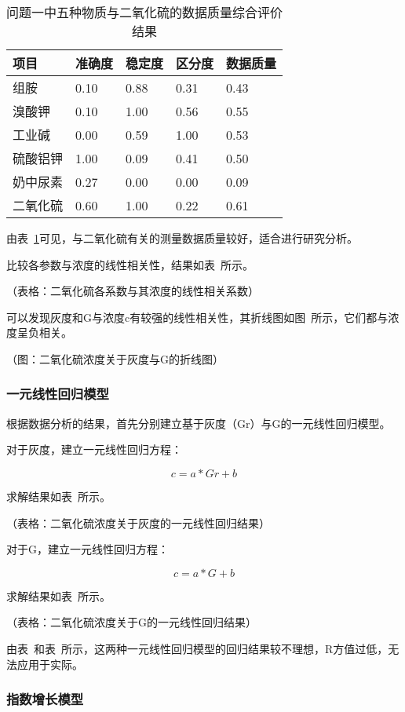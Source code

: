 \begin{table}[]
    \centering
    \caption{问题一中五种物质与二氧化硫的数据质量综合评价结果}
    \label{SO2_Judge}
    \begin{tabular}{@{}lllll@{}}
    \toprule
    项目   & 准确度  & 稳定度  & 区分度  & 数据质量 \\ \midrule
    组胺   & 0.10 & 0.88 & 0.31 & 0.43 \\
    溴酸钾  & 0.10 & 1.00 & 0.56 & 0.55 \\
    工业碱  & 0.00 & 0.59 & 1.00 & 0.53 \\
    硫酸铝钾 & 1.00 & 0.09 & 0.41 & 0.50 \\
    奶中尿素 & 0.27 & 0.00 & 0.00 & 0.09 \\
    二氧化硫 & 0.60 & 1.00 & 0.22 & 0.61 \\ \bottomrule
    \end{tabular}
    \end{table}

由表~\ref{SO2_Judge}可见，与二氧化硫有关的测量数据质量较好，适合进行研究分析。

比较各参数与浓度的线性相关性，结果如表~所示。

（表格：二氧化硫各系数与其浓度的线性相关系数）

可以发现灰度和G与浓度c有较强的线性相关性，其折线图如图~所示，它们都与浓度呈负相关。

（图：二氧化硫浓度关于灰度与G的折线图）

\subsubsection{一元线性回归模型}

根据数据分析的结果，首先分别建立基于灰度（Gr）与G的一元线性回归模型。

对于灰度，建立一元线性回归方程：

$$c=a*Gr+b$$

求解结果如表~所示。

（表格：二氧化硫浓度关于灰度的一元线性回归结果）

对于G，建立一元线性回归方程：

$$c=a*G+b$$

求解结果如表~所示。

（表格：二氧化硫浓度关于G的一元线性回归结果）

由表~和表~所示，这两种一元线性回归模型的回归结果较不理想，R方值过低，无法应用于实际。

\subsubsection{指数增长模型}

